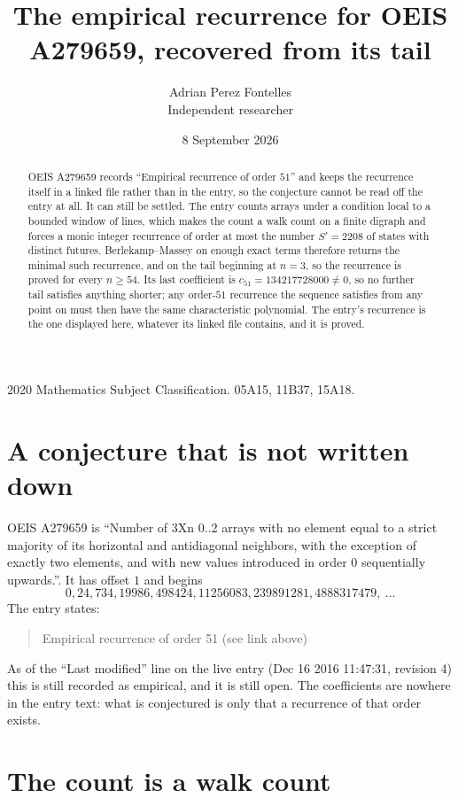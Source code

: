 \documentclass[11pt,a4paper]{article}
\title{The empirical recurrence for OEIS A279659, recovered from its tail}
\author{Adrian Perez Fontelles\\ \small Independent researcher}
\date{8 September 2026}
\theoremstyle{plain}
\theoremstyle{definition}
\begin{document}
\maketitle

\begin{abstract}
OEIS A279659 records ``Empirical recurrence of order $51$'' and keeps the recurrence itself in
a linked file rather than in the entry, so the conjecture cannot be read off the entry at all.
It can still be settled. The entry counts arrays under a condition local to a bounded window of
lines, which makes the count a walk count on a finite digraph and forces a monic integer
recurrence of order at most the number $S'=2208$ of states with distinct futures. Berlekamp--Massey on
enough exact terms therefore returns the minimal such recurrence, and on the tail beginning at $n=3$, so the recurrence is proved for every $n\ge54$.
Its last coefficient is $c_{51}=134217728000\neq0$, so no further tail satisfies anything
shorter; any order-$51$ recurrence the sequence satisfies from any point on must then have
the same characteristic polynomial. The entry's recurrence is the one displayed here, whatever
its linked file contains, and it is proved.
\end{abstract}

\noindent\small 2020 Mathematics Subject Classification. 05A15, 11B37, 15A18.\normalsize

\section{A conjecture that is not written down}

OEIS A279659 is ``Number of 3Xn 0..2 arrays with no element equal to a strict majority of its horizontal and antidiagonal neighbors, with the exception of exactly two elements, and with new values introduced in order 0 sequentially upwards.''. It has offset $1$ and begins
\[
0, 24, 734, 19986, 498424, 11256083, 239891281, 4888317479,\ \dots
\]
The entry states:
\begin{quote}
Empirical recurrence of order 51 (see link above)
\end{quote}
As of the ``Last modified'' line on the live entry (Dec 16 2016 11:47:31, revision 4)
this is still recorded as empirical, and it is still open. The coefficients are nowhere in the
entry text: what is conjectured is only that a recurrence of that order exists.

\section{The count is a walk count}
\end{document}
